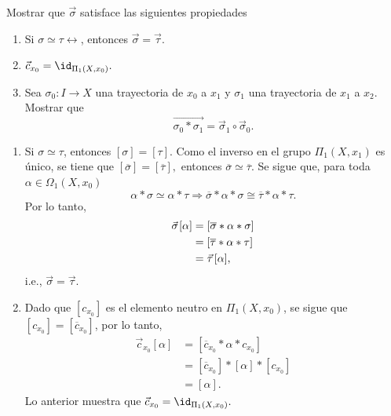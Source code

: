 \begin{ejercicio}
        Mostrar que $\Vec{\sigma}$ satisface las siguientes propiedades
        \begin{enumerate}
            \item[(1)] Si $\sigma\simeq\tau\rel$, entonces $\Vec{\sigma}=\Vec{\tau}.$
            \item[(2)] $\Vec{c}_{x_0}=\id_{\Pi_1(X,x_0)}.$ 
            \item[(3)]  Sea $\sigma_0:I\to X$ una trayectoria de $x_0$ a $x_1$ y $\sigma_1$ una trayectoria de $x_1$ a $x_2$. Mostrar que $$\overrightarrow{\sigma_0*\sigma_1}=\Vec{\sigma}_1\circ \Vec{\sigma}_0.$$
        \end{enumerate}
    \end{ejercicio}

\begin{demostracion}
\begin{enumerate}[label=(\arabic*)]
    \item Si $\sigma\simeq \tau$, entonces $[\sigma]=[\tau]$. Como el inverso en el grupo $\Pi_1(X,x_1)$ es único, se tiene que $[\overline{\sigma}]=[\overline{\tau}],$ entonces $\overline{\sigma}\simeq\overline{\tau}$. Se sigue que, para toda $\alpha\in\Omega_1(X,x_0)$
    \begin{equation*}
        \alpha*\sigma\simeq \alpha*\tau\Rightarrow
        \overline{\sigma}*\alpha*\sigma\cong \overline{\tau}*\alpha*\tau.
    \end{equation*}
    Por lo tanto,
    \begin{align*}
        \Vec{\sigma}\hspace{0.3mm}[\alpha]&=[\overline{\sigma}*\alpha*\sigma]\\
        &=[\overline{\tau}*\alpha*\tau]\\
        &=\Vec{\tau}\hspace{0.4mm}[\alpha],
    \end{align*}
    i.e., $\Vec{\sigma}=\Vec{\tau}.$
    \item Dado que $[c_{x_0}]$ es el elemento neutro en $\Pi_1(X,x_0)$, se sigue que $[c_{x_0}]=[\overline{c}_{x_0}]$, por lo tanto,
    \begin{align*}
        \Vec{c}_{x_0}[\alpha]&=[\overline{c}_{x_0}*\alpha*c_{x_0}]\\
        &=[\overline{c}_{x_0}]*[\alpha]*[c_{x_0}]\\
        &=[\alpha].
    \end{align*}
    Lo anterior muestra que $\Vec{c}_{x_0}=\id_{\Pi_1(X,x_0)}.$

\end{enumerate}
\end{demostracion}
